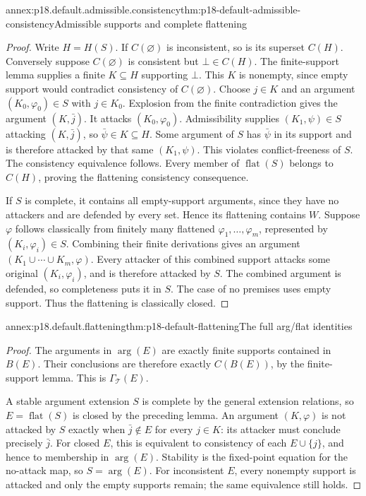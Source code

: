 \begin{annexitem}{annex:p18.default.admissible.consistency}{thm:p18-default-admissible-consistency}{Admissible supports and complete flattening}
\begin{proof}
Write \(H=H(S)\). If \(C(\varnothing)\)
is inconsistent, so is its superset
\(C(H)\). Conversely suppose
\(C(\varnothing)\) is consistent but
\(\bot\in C(H)\). The finite-support
lemma supplies a finite \(K\subseteq H\)
supporting \(\bot\). This \(K\) is
nonempty, since empty support would
contradict consistency of \(C(\varnothing)\).
Choose \(j\in K\) and an argument
\((K_0,\varphi_0)\in S\) with \(j\in K_0\).
Explosion from the finite contradiction
gives the argument \((K,\bar j)\).
It attacks \((K_0,\varphi_0)\).
Admissibility supplies \((K_1,\psi)\in S\)
attacking \((K,\bar j)\), so
\(\bar\psi\in K\subseteq H\).
Some argument of \(S\) has
\(\bar\psi\) in its support and
is therefore attacked by that
same \((K_1,\psi)\). This violates
conflict-freeness of \(S\).
The consistency equivalence follows.
Every member of \(\operatorname{flat}(S)\)
belongs to \(C(H)\), proving the
flattening consistency consequence.

If \(S\) is complete, it contains
all empty-support arguments, since
they have no attackers and are
defended by every set. Hence its
flattening contains \(W\).
Suppose \(\varphi\) follows classically
from finitely many flattened
\(\varphi_1,\ldots,\varphi_m\), represented
by \((K_i,\varphi_i)\in S\).
Combining their finite derivations
gives an argument
\((K_1\cup\cdots\cup K_m,\varphi)\).
Every attacker of this combined
support attacks some original
\((K_i,\varphi_i)\), and is therefore
attacked by \(S\). The combined
argument is defended, so completeness
puts it in \(S\). The case of
no premises uses empty support.
Thus the flattening is classically
closed.
\end{proof}
\end{annexitem}

\begin{annexitem}{annex:p18.default.flattening}{thm:p18-default-flattening}{The full arg/flat identities}
\begin{proof}
The arguments in \(\operatorname{arg}(E)\)
are exactly finite supports contained
in \(B(E)\). Their conclusions are
therefore exactly \(C(B(E))\), by
the finite-support lemma. This
is \(\Gamma_{\mathcal T}(E)\).

A stable argument extension \(S\)
is complete by the general extension
relations, so \(E=\operatorname{flat}(S)\)
is closed by the preceding lemma.
An argument \((K,\varphi)\) is
not attacked by \(S\) exactly
when \(\bar j\notin E\) for
every \(j\in K\): its attacker
must conclude precisely \(\bar j\).
For closed \(E\), this is
equivalent to consistency of
each \(E\cup\{j\}\), and hence
to membership in \(\operatorname{arg}(E)\).
Stability is the fixed-point
equation for the no-attack map,
so \(S=\operatorname{arg}(E)\).
For inconsistent \(E\), every
nonempty support is attacked
and only the empty supports
remain; the same equivalence
still holds.
\end{proof}
\end{annexitem}

